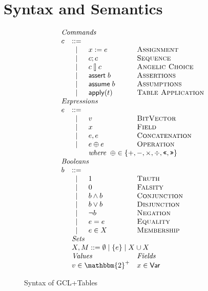 \section{Syntax and Semantics}


\begin{figure}[ht]
  \[\begin{array}{l c l l}
      \multicolumn{4}{l}{\textit{Commands}}\\
      c & ::=& \\
        & \mid & x := e & \textsc{Assignment}\\
        & \mid & c;c & \textsc{Sequence} \\
        & \mid & c \angel c & \textsc{Angelic Choice}\\
        & \mid & \assert b & \textsc{Assertions} \\
        & \mid & \assume b & \textsc{Assumptions} \\
        & \mid & \apply t & \textsc{Table Application}\\
      \multicolumn{4}{l}{\textit{Expressions}} \\
      e & ::= & \\
        & \mid & v            & \textsc{BitVector} \\
        & \mid & x            & \textsc{Field} \\
        & \mid & e,e          & \textsc{Concatenation} \\
        & \mid & e \oplus e   & \textsc{Operation} \\
        & &  \multicolumn{2}{l}{\textit{where}\;\; \oplus \in \{+,-,\times, \div, \texttt{<<}, \texttt{>>} \}} \\
      \multicolumn{4}{l}{\textit{Booleans}}\\
      b & ::= & \\
        & \mid & \TRUE & \textsc{Truth} \\
        & \mid & \FALSE & \textsc{Falsity} \\
        & \mid & b \wedge b & \textsc{Conjunction} \\
        & \mid & b \vee b & \textsc{Disjunction} \\
        & \mid & \neg b & \textsc{Negation} \\
        & \mid & e = e & \textsc{Equality} \\
        & \mid & e \in X & \textsc{Membership} \\
      & \multicolumn 3 l{\textit{Sets}} \\
      & \multicolumn 3 l {X,M ::= \emptyset \mid \{e\} \mid X \cup X}\\
      & \multicolumn{2}{l}{\textit{Values}} &  \multicolumn{1}{l}{\textit{Fields}} \\
      & \multicolumn{2}{l}{v \in \mathbbm{2}^+} & \multicolumn{1}{l}{x \in \mathsf{Var}}
    \end{array}\]

  \caption{Syntax of GCL+Tables}
  \label{fig:syntaxgcl}
  
\end{figure}


